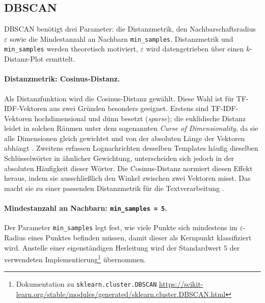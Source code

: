 \subsection{DBSCAN}
\label{sec:eval:param:dbscan}

DBSCAN benötigt drei Parameter: die Distanzmetrik, den Nachbarschaftsradius
$\varepsilon$ sowie die Mindestanzahl an Nachbarn \texttt{min\_samples}.
Distanzmetrik und \texttt{min\_samples} werden theoretisch motiviert,
$\varepsilon$ wird datengetrieben über einen $k$-Distanz-Plot ermittelt.

\paragraph{Distanzmetrik: Cosinus-Distanz.}
Als Distanzfunktion wird die Cosinus-Distanz gewählt.
Diese Wahl ist für TF-IDF-Vektoren aus zwei Gründen besonders geeignet.
Erstens sind TF-IDF-Vektoren hochdimensional und dünn besetzt
(\textit{sparse}); die euklidische Distanz leidet in solchen Räumen unter dem
sogenannten \textit{Curse of Dimensionality}, da sie alle Dimensionen gleich
gewichtet und von der absoluten Länge der Vektoren
abhängt \cite{Leskovec2020_Kap7_1}. Zweitens erfassen Lognachrichten
desselben Templates häufig dieselben Schlüsselwörter in ähnlicher Gewichtung,
unterscheiden sich jedoch in der absoluten Häufigkeit dieser Wörter. Die
Cosinus-Distanz normiert diesen Effekt heraus, indem sie ausschließlich den
Winkel zwischen zwei Vektoren misst. Das macht sie zu einer passenden Distanzmetrik für die Textverarbeitung \cite{MetricGate2026}.

\paragraph{Mindestanzahl an Nachbarn: \texttt{min\_samples = 5}.}
Der Parameter \texttt{min\_samples} legt fest, wie viele Punkte sich
mindestens im $\varepsilon$-Radius eines Punktes befinden müssen, damit dieser
als Kernpunkt klassifiziert wird. Anstelle einer eigenständigen Herleitung
wird der Standardwert $5$ der verwendeten
Implementierung\footnote{Dokumentation zu \texttt{sklearn.cluster.DBSCAN}
\url{https://scikit-learn.org/stable/modules/generated/sklearn.cluster.DBSCAN.html}}
übernommen.

